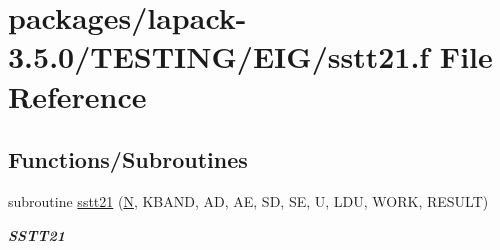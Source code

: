 \hypertarget{sstt21_8f}{}\section{packages/lapack-\/3.5.0/\+T\+E\+S\+T\+I\+N\+G/\+E\+I\+G/sstt21.f File Reference}
\label{sstt21_8f}
\subsection*{Functions/\+Subroutines}
\begin{DoxyCompactItemize}
\item 
subroutine \hyperlink{group__single__eig_ga7e0e860e3759067b5e3ace2787d8415d}{sstt21} (\hyperlink{polmisc_8c_a0240ac851181b84ac374872dc5434ee4}{N}, K\+B\+A\+N\+D, A\+D, A\+E, S\+D, S\+E, U, L\+D\+U, W\+O\+R\+K, R\+E\+S\+U\+L\+T)
\begin{DoxyCompactList}\small\item\em {\bfseries S\+S\+T\+T21} \end{DoxyCompactList}\end{DoxyCompactItemize}
